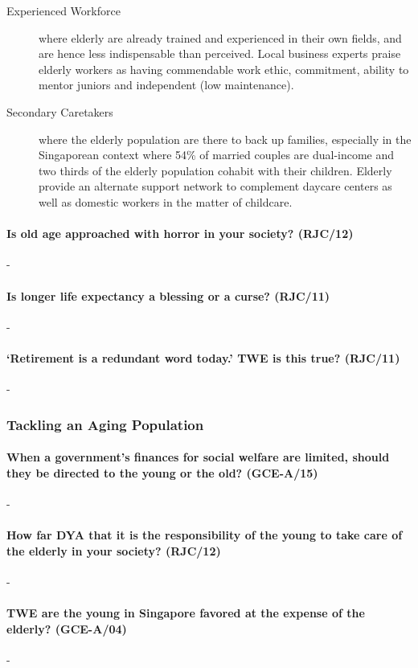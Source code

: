 \documentclass[../../main]{subfiles}
\begin{document}
\begin{description}
\begin{description}
			\item[Experienced Workforce] where elderly are already trained and experienced in their own fields, and are hence less indispensable than perceived. Local business experts praise elderly workers as having commendable work ethic, commitment, ability to mentor juniors and independent (low maintenance).
			\item[Secondary Caretakers] where the elderly population are there to back up families, especially in the Singaporean context where 54\% of married couples are dual-income and two thirds of the elderly population cohabit with their children. Elderly provide an alternate support network to complement daycare centers as well as domestic workers in the matter of childcare.
		\end{description}
\end{description}

\paragraph{Is old age approached with horror in your society? (RJC/12)}-

\paragraph{Is longer life expectancy a blessing or a curse? (RJC/11)}-

\paragraph{`Retirement is a redundant word today.' TWE is this true? (RJC/11)}-

\subsubsection{Tackling an Aging Population}

\paragraph{When a government's finances for social welfare are limited, should they be directed to the young or the old? (GCE-A/15)}-

\paragraph{How far DYA that it is the responsibility of the young to take care of the elderly in your society? (RJC/12)}-

\paragraph{TWE are the young in Singapore favored at the expense of the elderly? (GCE-A/04)}-
\end{document}
